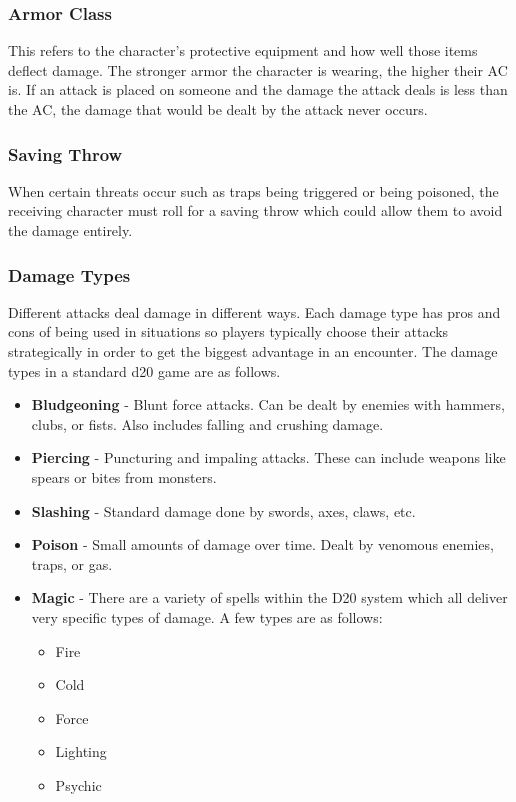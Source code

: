 \documentclass[12pt,a4paper]{report}
\begin{document}
		\subsubsection{Armor Class}
			This refers to the character's protective equipment and how well those items deflect damage. The stronger armor the character is wearing, the higher their AC is. If an attack is placed on someone and the damage the attack deals is less than the AC, the damage that would be dealt by the attack never occurs. 
		\subsubsection{Saving Throw}
			When certain threats occur such as traps being triggered or being poisoned, the receiving character must roll for a saving throw which could allow them to avoid the damage entirely.
		\subsubsection{Damage Types}
			Different attacks deal damage in different ways. Each damage type has pros and cons of being used in situations so players typically choose their attacks strategically in order to get the biggest advantage in an encounter. The damage types in  a standard d20 game are as follows. 
		\begin{itemize}
			\item \textbf{Bludgeoning} - Blunt force attacks. Can be dealt by enemies with hammers, clubs, or fists. Also includes falling and crushing damage.
			\item \textbf{Piercing} - Puncturing and impaling attacks. These can include weapons like spears or bites from monsters.
			\item \textbf{Slashing} - Standard damage done by swords, axes, claws, etc.
			\item \textbf{Poison} - Small amounts of damage over time. Dealt by venomous enemies, traps, or gas.
			\item \textbf{Magic} - There are a variety of spells within the D20 system which all deliver very specific types of damage. A few types are as follows:
			\begin{itemize}
				\item Fire
				\item Cold
				\item Force
				\item Lighting
				\item Psychic
			\end{itemize}
		\end{itemize}
\end{document}
